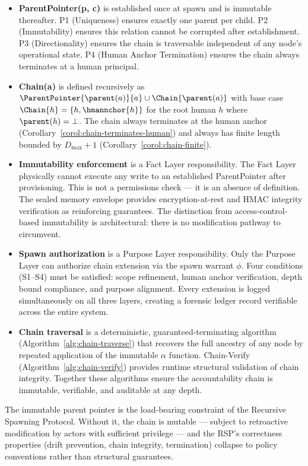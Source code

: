 \begin{itemize}[noitemsep]
    \item \textbf{ParentPointer(p, c)} is established once at spawn and is immutable thereafter. P1 (Uniqueness) ensures exactly one parent per child. P2 (Immutability) ensures this relation cannot be corrupted after establishment. P3 (Directionality) ensures the chain is traversable independent of any node's operational state. P4 (Human Anchor Termination) ensures the chain always terminates at a human principal.

    \item \textbf{Chain(a)} is defined recursively as $\ParentPointer{\parent(a)}{a} \cup \Chain{\parent(a)}$ with base case $\Chain{h} = \{h, \hmannchor{h}\}$ for the root human $h$ where $\parent(h) = \bot$. The chain always terminates at the human anchor (Corollary~\ref{corol:chain-terminates-human}) and always has finite length bounded by $D_{\max} + 1$ (Corollary~\ref{corol:chain-finite}).

    \item \textbf{Immutability enforcement} is a Fact Layer responsibility. The Fact Layer physically cannot execute any write to an established ParentPointer after provisioning. This is not a permissions check --- it is an absence of definition. The sealed memory envelope provides encryption-at-rest and HMAC integrity verification as reinforcing guarantees. The distinction from access-control-based immutability is architectural: there is no modification pathway to circumvent.

    \item \textbf{Spawn authorization} is a Purpose Layer responsibility. Only the Purpose Layer can authorize chain extension via the spawn warrant $\phi$. Four conditions (S1--S4) must be satisfied: scope refinement, human anchor verification, depth bound compliance, and purpose alignment. Every extension is logged simultaneously on all three layers, creating a forensic ledger record verifiable across the entire system.

    \item \textbf{Chain traversal} is a deterministic, guaranteed-terminating algorithm (Algorithm~\ref{alg:chain-traverse}) that recovers the full ancestry of any node by repeated application of the immutable $\alpha$ function. Chain-Verify (Algorithm~\ref{alg:chain-verify}) provides runtime structural validation of chain integrity. Together these algorithms ensure the accountability chain is immutable, verifiable, and auditable at any depth.
\end{itemize}

The immutable parent pointer is the load-bearing constraint of the Recursive Spawning Protocol. Without it, the chain is mutable --- subject to retroactive modification by actors with sufficient privilege --- and the RSP's correctness properties (drift prevention, chain integrity, termination) collapse to policy conventions rather than structural guarantees.
